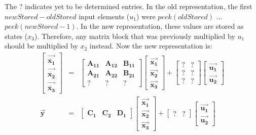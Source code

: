     The ? indicates yet to be determined entries. In the old
representation, the first $newStored-oldStored$ input elements
($u_1$) were $peek(oldStored)$ ... $peek(newStored-1)$. In the new
representation, these values are stored as states ($x_3$).
Therefore, any matrix block that was previously multiplied by
$u_1$ should be multiplied by $x_2$ instead. Now the new
representation is:
\begin{eqnarray*}
\left [ \begin{array} {c} \vec{\dot{\mathbf{x_1}}} \\ \vec{\dot{\mathbf{x_2}}} \\
\vec{\dot{\mathbf{x_3}}}
\end{array} \right ] & = & \left [ \begin{array} {ccc} \mathbf{A_{11}} &
\mathbf{A_{12}} & \mathbf{B_{11}} \\ \mathbf{A_{21}} &
\mathbf{A_{22}} & \mathbf{B_{21}} \\ ? & ? & ?  \end{array} \right
] \left [
\begin{array} {c} \vec{\mathbf{x_1}} \\ \vec{\mathbf{x_2}} \\ \vec{\mathbf{x_3}} \end{array} \right ]
 + \left [ \begin{array} {cc} ? & ? \\ ? & ? \\ ? & ? \end{array} \right ] \left[
\begin{array} {c} \vec{\mathbf{u_1}} \\ \vec{\mathbf{u_2}} \end{array} \right ] \\
\vec{\mathbf{y}} & = & \left [ \begin{array} {ccc} \mathbf{C_1} &
\mathbf{C_2} & \mathbf{D_1}  \end{array} \right ] \left [
\begin{array} {c} \vec{\mathbf{x_1}} \\ \vec{\mathbf{x_2}} \\ \vec{\mathbf{x_3}} \end{array} \right ] +
\left [ \begin{array} {cc} ? & ?
\end{array} \right ] \left [ \begin{array} {c} \vec{\mathbf{u_1}} \\
\vec{\mathbf{u_2}} \end{array} \right ]
\end{eqnarray*}

